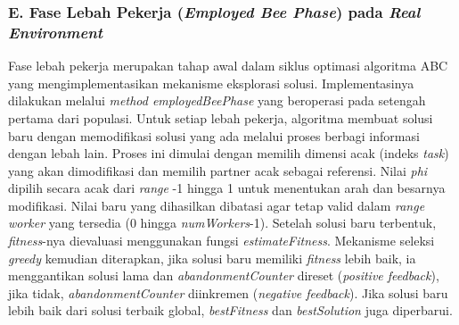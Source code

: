 \subsubsection{E. Fase Lebah Pekerja (\textit{Employed Bee Phase}) pada \textit{Real Environment}}
Fase lebah pekerja merupakan tahap awal dalam siklus optimasi algoritma ABC yang mengimplementasikan mekanisme eksplorasi solusi. Implementasinya dilakukan melalui \textit{method employedBeePhase} yang beroperasi pada setengah pertama dari populasi. Untuk setiap lebah pekerja, algoritma membuat solusi baru dengan memodifikasi solusi yang ada melalui proses berbagi informasi dengan lebah lain. Proses ini dimulai dengan memilih dimensi acak (indeks \textit{task}) yang akan dimodifikasi dan memilih partner acak sebagai referensi. Nilai \textit{phi} dipilih secara acak dari \textit{range} -1 hingga 1 untuk menentukan arah dan besarnya modifikasi. Nilai baru yang dihasilkan dibatasi agar tetap valid dalam \textit{range worker} yang tersedia (0 hingga \textit{numWorkers}-1). Setelah solusi baru terbentuk, \textit{fitness}-nya dievaluasi menggunakan fungsi \textit{estimateFitness}. Mekanisme seleksi \textit{greedy} kemudian diterapkan, jika solusi baru memiliki \textit{fitness} lebih baik, ia menggantikan solusi lama dan \textit{abandonmentCounter} direset (\textit{positive feedback}), jika tidak, \textit{abandonmentCounter} diinkremen (\textit{negative feedback}). Jika solusi baru lebih baik dari solusi terbaik global, \textit{bestFitness} dan \textit{bestSolution} juga diperbarui.

